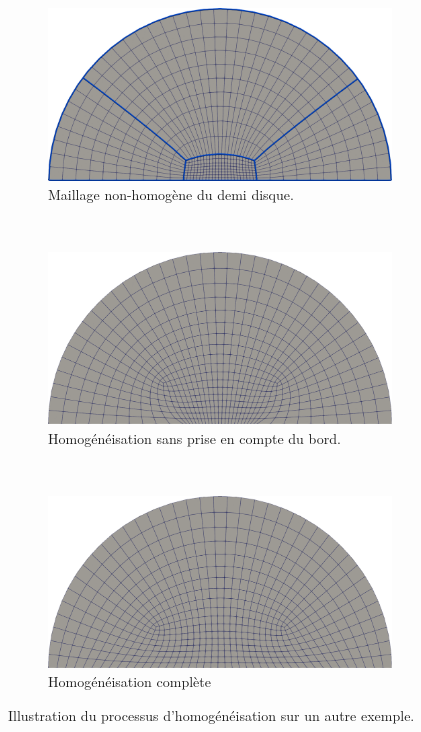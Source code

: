 \begin{figure}[h!]
\centering
\begin{subfigure}{0.65\textwidth}
    \includegraphics[width=\textwidth]{images/non_homo_demiDisc.pdf}
    \caption{Maillage non-homogène du demi disque.}
    \label{fig:homo_demiDisc_1}
\end{subfigure}
\\[0.5cm]
\begin{subfigure}{0.65\textwidth}
    \includegraphics[width=\textwidth]{images/homo_sans_bord_demiDisc.pdf}
    \caption{Homogénéisation sans prise en compte du bord.}
    \label{fig:homo_demiDisc_2}
\end{subfigure}
\\[0.5cm]
\begin{subfigure}{0.65\textwidth}
    \includegraphics[width=\textwidth]{images/homo_avec_bord_demiDisc.pdf}
    \caption{Homogénéisation complète}
    \label{fig:homo_demiDisc_3}
\end{subfigure}
\caption{Illustration du processus d'homogénéisation sur un autre exemple.}
\label{fig:homo_demiDisc}
\end{figure}
